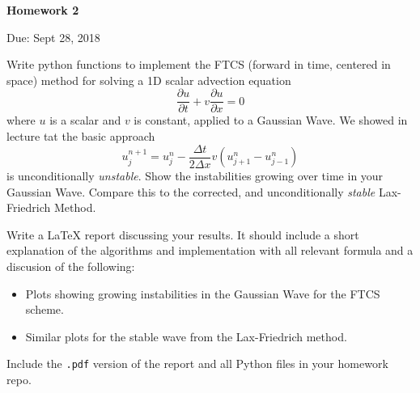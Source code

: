 \documentclass{article}
\begin{document}
\begin{center}

\vspace*{-2.5cm}
\LARGE
\bf{Homework 2}
\vspace{1cm}

\large{Due: Sept 28, 2018}
\vspace{1cm}

\end{center}

Write python functions to implement the FTCS (forward in time, centered in space) method for solving a 1D scalar advection equation
\begin{equation*}
   \frac{\partial u}{\partial t} + v \frac{\partial u}{\partial x} = 0
\end{equation*}
where $u$ is a scalar and $v$ is constant, applied to a Gaussian Wave. We showed in lecture tat the basic approach
\begin{equation*}
   u_j^{n+1} = u^n_j - \frac{\Delta t}{2\Delta x}v \left( u^n_{j+1} - u^n_{j-1} \right) 
\end{equation*}
is unconditionally \emph{unstable}.  Show the instabilities growing over time in your Gaussian Wave.  Compare this to the corrected, and unconditionally \emph{stable} Lax-Friedrich Method.
\par
Write a \LaTeX{} report discussing your results.  It should include a short explanation of the algorithms and implementation with all relevant formula and a discusion of the following:
\begin{itemize}
   \item Plots showing growing instabilities in the Gaussian Wave for the FTCS scheme.
   \item Similar plots for the stable wave from the Lax-Friedrich method.
\end{itemize}
Include the \texttt{.pdf} version of the report and all Python files in your homework repo.
\end{document}
